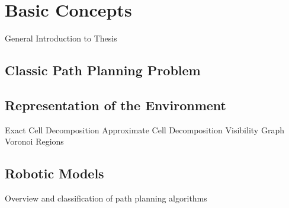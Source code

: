 \chapter{Basic Concepts}\label{ch:introductionplanning}
General Introduction to Thesis

\section{Classic Path Planning Problem}\label{sec:basic}

\section{Representation of the Environment}\label{sec:representation}
Exact Cell Decomposition
Approximate Cell Decomposition
Visibility Graph
Voronoi Regions

\section{Robotic Models}\label{sec:model}
Overview and classification of path planning algorithms

